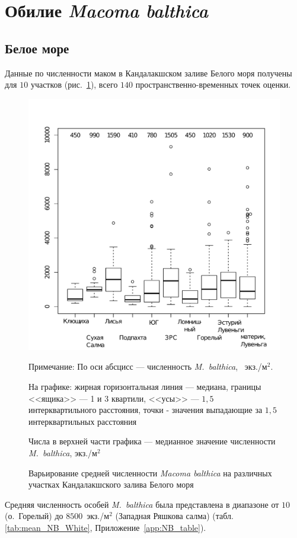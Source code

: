 	\section{Обилие {\it Macoma balthica}}
	\subsection{Белое море}
Данные по численности маком в Кандалакшском заливе Белого моря получены для $10$ участков (рис.~\ref{ris:N_area_White}), всего $140$ пространственно-временных точек оценки.
	\begin{figure}[h]
	\begin{center}
		\includegraphics[height=0.5\textheight]{../All_N/N2_area_White1.pdf}
	\end{center}
	\caption{Варьирование средней численности {\it Macoma balthica} на различных участках Кандалакшского залива Белого моря}
	{\footnotesize Примечание: По оси абсцисс --- численность {\it M.~balthica}, ~экз./м$^2$.

	На графике: жирная горизонтальная линия --- медиана, границы <<ящика>> --- 1 и 3 квартили, <<усы>> --- $1,5$ интерквартильного расстояния, точки - значения выпадающие за $1,5$ интерквартильных расстояния

Числа в верхней части графика --- медианное значение численности {\it M.~balthica}, экз./м$^2$}
	\label{ris:N_area_White}
	\end{figure}
Средняя численность особей {\it M.~balthica} была представлена в диапазоне от $10$ (о.~Горелый) до $8500$~экз./м$^2$ (Западная Ряшкова салма) (табл. \ref{tab:mean_NB_White}, Приложение~\ref{app:NB_table}).

